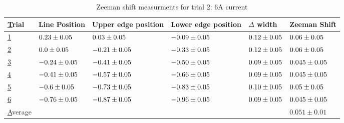 \begin{table}[H]
    \begin{adjustwidth}{-100pt}{-100pt}
        \centering
        \begin{tabular}{|l|l|l|l|l|l|}
            \hline
            {\ul Trial}   & Line Position                & Upper edge position          & Lower edge position          & $\Delta$ width              & Zeeman Shift                 \\ \hline
            {\ul 1}       & $0.23 \pm 0.05$  & $0.03 \pm 0.05$  & $-0.09 \pm 0.05$ & $0.12 \pm 0.05$ & $0.06 \pm 0.05$  \\ \hline
            {\ul 2}       & $0.0 \pm 0.05$   & $-0.21 \pm 0.05$ & $-0.33 \pm 0.05$ & $0.12 \pm 0.05$ & $0.06 \pm 0.05$  \\ \hline
            {\ul 3}       & $-0.24 \pm 0.05$ & $-0.41 \pm 0.05$ & $-0.50 \pm 0.05$ & $0.09 \pm 0.05$ & $0.045 \pm 0.05$ \\ \hline
            {\ul 4}       & $-0.41 \pm 0.05$ & $-0.57 \pm 0.05$ & $-0.66 \pm 0.05$ & $0.09 \pm 0.05$ & $0.045 \pm 0.05$ \\ \hline
            {\ul 5}       & $-0.6 \pm 0.05$  & $-0.73 \pm 0.05$ & $-0.83 \pm 0.05$ & $0.10 \pm 0.05$ & $0.05 \pm 0.05$  \\ \hline
            {\ul 6}       & $-0.76 \pm 0.05$ & $-0.87 \pm 0.05$ & $-0.96 \pm 0.05$ & $0.09 \pm 0.05$ & $0.045 \pm 0.05$ \\ \hline
            {\ul Average} &                              &                              &                              &                             & $0.051 \pm 0.01$             \\ \hline
        \end{tabular}
    \end{adjustwidth}

    \caption{Zeeman shift measurments for trial 2: 6A current}


\end{table}


